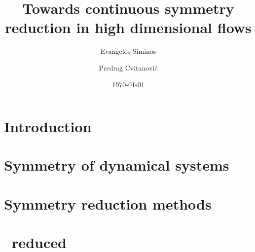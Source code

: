 \documentclass[aps,pre,preprint,groupedaddress]{revtex4}
\begin{document}
\title{Towards continuous symmetry reduction in high dimensional flows}
\author{Evangelos Siminos}
\author{Predrag Cvitanovi\'c}

\date{\today}

\begin{abstract}
\end{abstract}

\pacs{}

\maketitle

\section{\label{s:intro} Introduction}
    

\subsection{\label{s:introCLE} \CLe}
    

\section{\label{s:symDyn} Symmetry of dynamical systems}
    

\section{\label{s:symRedGeneral} Symmetry reduction methods}
    
    
    

\section{\label{s:CLeReduced} \CLe\ reduced \statesp}
    
\end{document}
